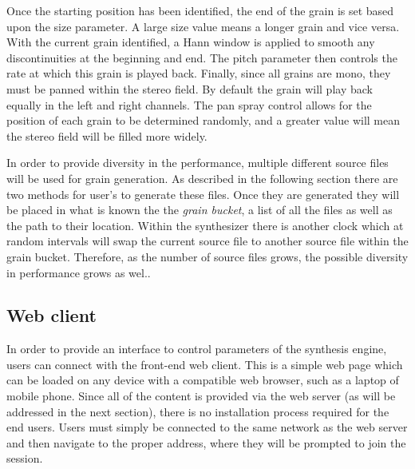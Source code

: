 \documentclass{nime-alternate}
\begin{document}
Once the starting position has been identified, the end of the grain is set
based upon the size parameter. A large size value means a longer grain and vice versa. 
With the current grain identified, a Hann window is applied to smooth any discontinuities at the beginning and end.
The pitch parameter then controls the rate at which this grain is played back. Finally, since all grains are
mono, they must be panned within the stereo field. By default the grain will play back equally in the left and right channels.
The pan spray control allows for the position of each grain to be determined randomly, and a greater value will mean 
the stereo field will be filled more widely. 

In order to provide diversity in the performance, multiple different source files will be used for grain generation. 
As described in the following section there are two methods for user's to generate these files. 
Once they are generated they will be placed in what is known the the \emph{grain bucket}, a list of all the files
as well as the path to their location. 
Within the synthesizer there is another clock which at random intervals 
will swap the current source file to another source file within the grain bucket. 
Therefore, as the number of source files grows, the possible diversity in performance grows as wel..

\subsection{Web client}

In order to provide an interface to control parameters of the synthesis engine, users can connect with the front-end web client. 
This is a simple web page which can be loaded on any device with a compatible web browser, such as a laptop of mobile phone. 
Since all of the content is provided via the web server (as will be addressed in the next section),
there is no installation process required for the end users. Users must simply be connected to the 
same network as the web server and then navigate to the proper address, where they will be prompted to join the session. 
\end{document}
